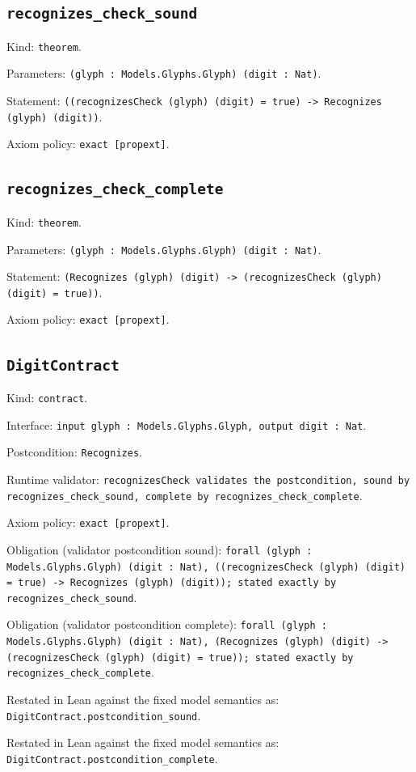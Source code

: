 \documentclass[11pt]{article}
\begin{document}
\subsection*{\texttt{recognizes\_check\_sound}}
\noindent Kind: \texttt{theorem}.\par
\noindent Parameters: \texttt{(glyph : Models.Glyphs.Glyph) (digit : Nat)}.\par
\noindent Statement: \texttt{((recognizesCheck (glyph) (digit) = true) -> Recognizes (glyph) (digit))}.\par
\noindent Axiom policy: \texttt{exact [propext]}.\par
\subsection*{\texttt{recognizes\_check\_complete}}
\noindent Kind: \texttt{theorem}.\par
\noindent Parameters: \texttt{(glyph : Models.Glyphs.Glyph) (digit : Nat)}.\par
\noindent Statement: \texttt{(Recognizes (glyph) (digit) -> (recognizesCheck (glyph) (digit) = true))}.\par
\noindent Axiom policy: \texttt{exact [propext]}.\par
\subsection*{\texttt{DigitContract}}
\noindent Kind: \texttt{contract}.\par
\noindent Interface: \texttt{input glyph : Models.Glyphs.Glyph, output digit : Nat}.\par
\noindent Postcondition: \texttt{Recognizes}.\par
\noindent Runtime validator: \texttt{recognizesCheck validates the postcondition, sound by recognizes\_check\_sound, complete by recognizes\_check\_complete}.\par
\noindent Axiom policy: \texttt{exact [propext]}.\par
\noindent Obligation (validator postcondition sound): \texttt{forall (glyph : Models.Glyphs.Glyph) (digit : Nat), ((recognizesCheck (glyph) (digit) = true) -> Recognizes (glyph) (digit)); stated exactly by recognizes\_check\_sound}.\par
\noindent Obligation (validator postcondition complete): \texttt{forall (glyph : Models.Glyphs.Glyph) (digit : Nat), (Recognizes (glyph) (digit) -> (recognizesCheck (glyph) (digit) = true)); stated exactly by recognizes\_check\_complete}.\par
\noindent Restated in Lean against the fixed model semantics as: \texttt{DigitContract.postcondition\_sound}.\par
\noindent Restated in Lean against the fixed model semantics as: \texttt{DigitContract.postcondition\_complete}.\par
\end{document}
